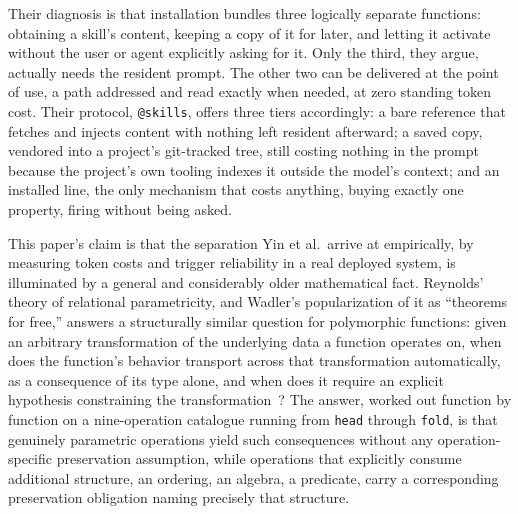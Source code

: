 \documentclass[11pt]{article}
\begin{document}
Their diagnosis is that installation bundles three logically separate functions: obtaining a skill's content, keeping a copy of it for later, and letting it activate without the user or agent explicitly asking for it. Only the third, they argue, actually needs the resident prompt. The other two can be delivered at the point of use, a path addressed and read exactly when needed, at zero standing token cost. Their protocol, \texttt{@skills}, offers three tiers accordingly: a bare reference that fetches and injects content with nothing left resident afterward; a saved copy, vendored into a project's git-tracked tree, still costing nothing in the prompt because the project's own tooling indexes it outside the model's context; and an installed line, the only mechanism that costs anything, buying exactly one property, firing without being asked.

This paper's claim is that the separation Yin et al.\ arrive at empirically, by measuring token costs and trigger reliability in a real deployed system, is illuminated by a general and considerably older mathematical fact. Reynolds' theory of relational parametricity, and Wadler's popularization of it as ``theorems for free,'' answers a structurally similar question for polymorphic functions: given an arbitrary transformation of the underlying data a function operates on, when does the function's behavior transport across that transformation automatically, as a consequence of its type alone, and when does it require an explicit hypothesis constraining the transformation~\cite{reynolds1983,wadler1989}? The answer, worked out function by function on a nine-operation catalogue running from \texttt{head} through \texttt{fold}, is that genuinely parametric operations yield such consequences without any operation-specific preservation assumption, while operations that explicitly consume additional structure, an ordering, an algebra, a predicate, carry a corresponding preservation obligation naming precisely that structure.
\end{document}

